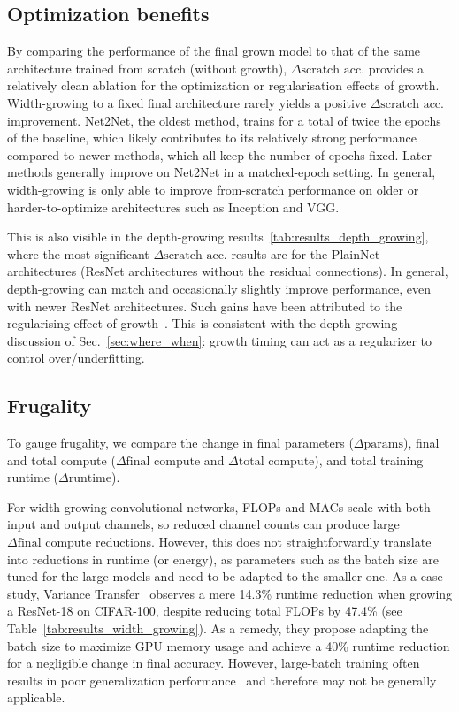\subsection{Optimization benefits}
By comparing the performance of the final grown model to that of the same architecture trained from scratch (without growth), $\Delta\textrm{scratch acc.}$ provides a relatively clean ablation for the optimization or regularisation effects of growth. Width-growing to a fixed final architecture rarely yields a positive $\Delta\textrm{scratch acc.}$ improvement. Net2Net, the oldest method, trains for a total of twice the epochs of the baseline, which likely contributes to its relatively strong performance compared to newer methods, which all keep the number of epochs fixed. Later methods generally improve on Net2Net in a matched-epoch setting. In general, width-growing is only able to improve from-scratch performance on older or harder-to-optimize architectures such as Inception and VGG.

This is also visible in the depth-growing results~\autoref{tab:results_depth_growing}, where the most significant $\Delta\textrm{scratch acc.}$ results are for the PlainNet architectures (ResNet architectures without the residual connections).
In general, depth-growing can match and occasionally slightly improve performance, even with newer ResNet architectures. Such gains have been attributed to the regularising effect of growth~\cite{wu_when_2024}. This is consistent with the depth-growing discussion of Sec.~\ref{sec:where_when}: growth timing can act as a regularizer to control over/underfitting.

\subsection{Frugality}
To gauge frugality, we compare the change in final parameters ($\Delta\textrm{params}$), final and total compute ($\Delta\textrm{final compute}$ and $\Delta\textrm{total compute}$), and total training runtime ($\Delta\textrm{runtime}$).

For width-growing convolutional networks, FLOPs and MACs scale with both input and output channels, so reduced channel counts can produce large $\Delta\textrm{final compute}$ reductions. However, this does not straightforwardly translate into reductions in runtime (or energy), as parameters such as the batch size are tuned for the large models and need to be adapted to the smaller one. As a case study, Variance Transfer~\citep{yuan_accelerated_2023} observes a mere 14.3\% runtime reduction when growing a ResNet-18 on CIFAR-100, despite reducing total FLOPs by 47.4\% (see Table~\ref{tab:results_width_growing}). As a remedy, they propose adapting the batch size to maximize GPU memory usage and achieve a 40\% runtime reduction for a negligible change in final accuracy. However, large-batch training often results in poor generalization performance~\citep{keskar_large-batch_2017} and therefore may not be generally applicable.


